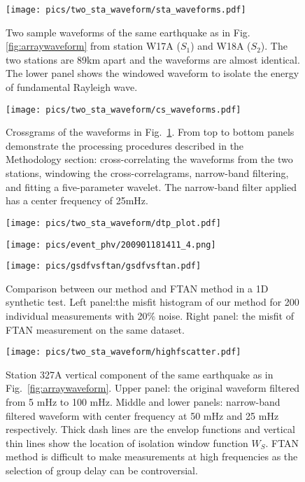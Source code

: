 \documentclass[referee]{gji}
\begin{document}
\begin{figure}
	\texttt{[image: pics/two\_sta\_waveform/sta\_waveforms.pdf]}
	\caption{Two sample waveforms of the same earthquake as in Fig.\ref{fig:arraywaveform} from station W17A ($S_1$) and W18A ($S_2$). The two stations are 89km apart and the waveforms are almost identical. The lower panel shows the windowed waveform to isolate the energy of fundamental Rayleigh wave.}
	\label{fig:twostawaveform}
\end{figure}

\begin{figure}
	\texttt{[image: pics/two\_sta\_waveform/cs\_waveforms.pdf]}
	\caption{Crossgrams of the waveforms in Fig.~\ref{fig:twostawaveform}. From top to bottom panels demonstrate the processing procedures described in the Methodology section: cross-correlating the waveforms from the two stations, windowing the cross-correlagrams, narrow-band filtering, and fitting a five-parameter wavelet. The narrow-band filter applied has a center frequency of 25mHz.}
	\label{fig:cswaveform}
\end{figure}

\begin{figure}
	\texttt{[image: pics/two\_sta\_waveform/dtp\_plot.pdf]}
	\caption{}
	\label{fig:dtp}
\end{figure}

\begin{figure}
	\texttt{[image: pics/event\_phv/200901181411\_4.png]}
	\caption{}
	\label{fig:eventfig}
\end{figure}

\begin{figure}
	\texttt{[image: pics/gsdfvsftan/gsdfvsftan.pdf]}
	\caption{Comparison between our method and FTAN method in a 1D synthetic test. Left panel:the misfit histogram of our method for 200 individual measurements with 20\% noise. Right panel: the misfit of FTAN measurement on the same dataset.}
	\label{fig:syntest}
\end{figure}

\begin{figure}
	\texttt{[image: pics/two\_sta\_waveform/highfscatter.pdf]}
	\caption{Station 327A vertical component of the same earthquake as in Fig.~\ref{fig:arraywaveform}. Upper panel: the original waveform filtered from 5 mHz to 100 mHz. Middle and lower panels: narrow-band filtered waveform with center frequency at 50 mHz and 25 mHz respectively. Thick dash lines are the envelop functions and vertical thin lines show the location of isolation window function $W_S$. FTAN method is difficult to make measurements at high frequencies as the selection of group delay can be controversial.}
	\label{fig:highfscatter}
\end{figure}
\end{document}
